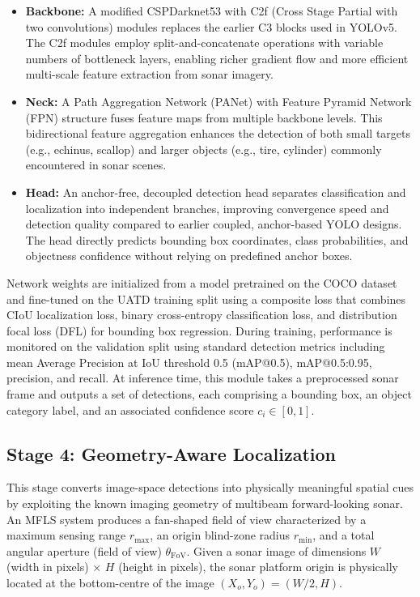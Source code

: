 \documentclass[conference]{IEEEtran}
\begin{document}
\begin{itemize}
    \item \textbf{Backbone:} A modified CSPDarknet53 with C2f (Cross Stage Partial with two convolutions) modules replaces the earlier C3 blocks used in YOLOv5. The C2f modules employ split-and-concatenate operations with variable numbers of bottleneck layers, enabling richer gradient flow and more efficient multi-scale feature extraction from sonar imagery.
    \item \textbf{Neck:} A Path Aggregation Network (PANet) with Feature Pyramid Network (FPN) structure fuses feature maps from multiple backbone levels. This bidirectional feature aggregation enhances the detection of both small targets (e.g., echinus, scallop) and larger objects (e.g., tire, cylinder) commonly encountered in sonar scenes.
    \item \textbf{Head:} An anchor-free, decoupled detection head separates classification and localization into independent branches, improving convergence speed and detection quality compared to earlier coupled, anchor-based YOLO designs. The head directly predicts bounding box coordinates, class probabilities, and objectness confidence without relying on predefined anchor boxes.
\end{itemize}

Network weights are initialized from a model pretrained on the COCO dataset and fine-tuned on the UATD training split using a composite loss that combines CIoU localization loss, binary cross-entropy classification loss, and distribution focal loss (DFL) for bounding box regression. During training, performance is monitored on the validation split using standard detection metrics including mean Average Precision at IoU threshold 0.5 (mAP@0.5), mAP@0.5:0.95, precision, and recall. At inference time, this module takes a preprocessed sonar frame and outputs a set of detections, each comprising a bounding box, an object category label, and an associated confidence score $c_i \in [0, 1]$.

\subsection{Stage 4: Geometry-Aware Localization}

This stage converts image-space detections into physically meaningful spatial cues by exploiting the known imaging geometry of multibeam forward-looking sonar. An MFLS system produces a fan-shaped field of view characterized by a maximum sensing range $r_{\max}$, an origin blind-zone radius $r_{\min}$, and a total angular aperture (field of view) $\theta_{\text{FoV}}$. Given a sonar image of dimensions $W$ (width in pixels) $\times$ $H$ (height in pixels), the sonar platform origin is physically located at the bottom-centre of the image $(X_o, Y_o) = (W/2, H)$. 
\end{document}
